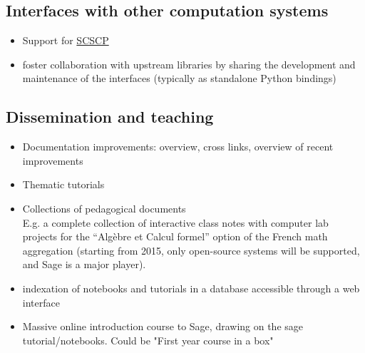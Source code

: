 \subsection{Interfaces with other computation systems}

\begin{itemize}
\item Support for \href{http://www.symbolic-computing.org/}{SCSCP}
\item foster collaboration with upstream libraries by sharing the
  development and maintenance of the interfaces (typically as
  standalone Python bindings)
\end{itemize}


\subsection{Dissemination and teaching}

\begin{itemize}
\item Documentation improvements: overview, cross links, overview of
  recent improvements
\item Thematic tutorials
\item Collections of pedagogical documents\\
  E.g. a complete collection of interactive class notes with computer
  lab projects for the ``Algèbre et Calcul formel'' option of the
  French math aggregation (starting from 2015, only open-source
  systems will be supported, and Sage is a major player).
\item indexation of notebooks and tutorials in a database accessible through a
  web interface
\item Massive online introduction course to Sage, drawing on the sage tutorial/notebooks.
Could be "First year \sage course in a box"
\end{itemize}


